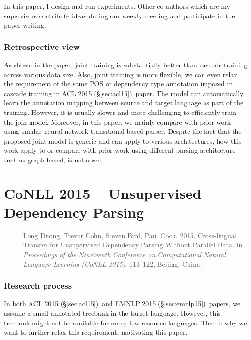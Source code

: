 \documentclass[12pt,twoside,final,hidelinks]{ltthesis}
\theoremstyle{definition}
\newcommand\aclv{ACL 2015 (\S\ref{sec:acl15})}
\newcommand\emnlpv{EMNLP 2015 (\S\ref{sec:emnlp15})}
\begin{document}
In this paper, I design and run experiments. Other co-authors which are my supervisors contribute ideas during our weekly 
meeting and participate in the paper writing. 

\subsubsection{Retrospective view}
As shown in the paper, joint training is substantially better than cascade training across various data size. Also, joint training is more flexible, we can 
even relax the requirement of the same POS or dependency type annotation imposed in cascade training in \aclv\ paper. The model can automatically learn the 
annotation mapping between source and target language as part of the training. However, it is usually slower and more challenging to efficiently train the 
join model. Moreover, in this paper, we mainly compare with prior work using similar neural network transitional based parser. Despite the fact that the 
proposed joint model is generic and can apply to various architectures, how this work apply to or compare  with prior work using different parsing 
architecture such as graph based, is unknown. 




\section{CoNLL 2015 --  Unsupervised Dependency Parsing}
\label{sec:conll15}
\begin{quote}
Long Duong, Trevor Cohn, Steven Bird, Paul Cook. 2015. Cross-lingual Transfer for Unsupervised Dependency Parsing Without Parallel Data. 
In \textit{Proceedings of the Nineteenth Conference on Computational Natural Language Learning (CoNLL 2015)}. 113--122, Beijing, China. 
\end{quote}

\subsubsection{Research process}
In both \aclv\ and \emnlpv\ papers, we assume a small annotated treebank in the target language. However, this treebank might not be available for 
many low-resource languages. That is why we want to further relax this requirement, motivating this paper. 
\end{document}
